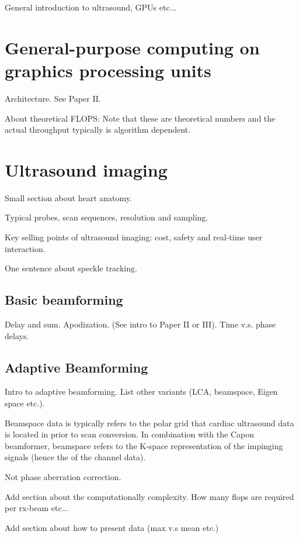 %

General introduction to ultrasound, GPUs etc...

\section{General-purpose computing on graphics processing units}

Architecture. See Paper II.

About theoretical FLOPS: Note that these are theoretical numbers and the actual throughput typically is algorithm dependent.

\section {Ultrasound imaging}

Small section about heart anatomy.

Typical probes, scan sequences, resolution and sampling.

Key selling points of ultrasound imaging: cost, safety and real-time user interaction.

One sentence about speckle tracking.
							
\subsection{Basic beamforming}

Delay and sum. Apodization. (See intro to Paper II or III).
Time v.s. phase delays.

\subsection{Adaptive Beamforming}\label{sec:adaptbf}

Intro to adaptive beamforming. List other variants (LCA, beamspace, Eigen space etc.). 

Beamspace data is typically refers to the polar grid that cardiac ultrasound data is located in prior to scan conversion. In combination with the Capon beamformer, beamspace refers to the K-space representation of the impinging signals (hence the  of the channel data). 

Not phase aberration correction.

Add section about the computationally complexity. How many flops are required per rx-beam etc...

Add section about how to present data (max v.s mean etc.)
						
